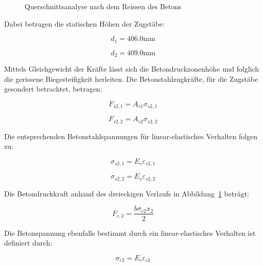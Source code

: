 \documentclass[
  12pt,
  letterpaper,
  egregdoesnotlikesansseriftitles]{scrreprt}
\begin{document}
\begin{figure}[H]


\caption{\label{fig-qs3_sv14}Querschnittsanalyse nach dem Reissen des
Betons}

\end{figure}%

Dabei betragen die statischen Höhen der Zugstäbe:

\begin{equation}d_{1} = 406.0 \text{mm}\end{equation}

\begin{equation}d_{2} = 409.0 \text{mm}\end{equation}

Mittels Gleichgewicht der Kräfte lässt sich die Betondruckzonenhöhe und
folglich die gerissene Biegesteifigkeit herleiten. Die
Betonstahlzugkräfte, für die Zugstäbe gesondert betrachtet, betragen:

\begin{equation}F_{s2,1} = A_{s 1} \sigma_{s 2,1}\end{equation}

\begin{equation}F_{s2,2} = A_{s 2} \sigma_{s 2,2}\end{equation}

Die entsprechenden Betonstahlspannungen für linear-elastisches Verhalten
folgen zu:

\begin{equation}\sigma_{s 2,1} = E_{s} \varepsilon_{s2,1}\end{equation}

\begin{equation}\sigma_{s 2,2} = E_{s} \varepsilon_{s2,2}\end{equation}

Die Betondruckkraft anhand des dreieckigen Verlaufs in
Abbildung~\ref{fig-qs3_sv14} beträgt:

\begin{equation}F_{c,2} = \frac{b \sigma_{c 2} x_{2}}{2}\end{equation}

Die Betonspannung ebenfalls bestimmt durch ein linear-elastisches
Verhalten ist definiert durch:

\begin{equation}\sigma_{c 2} = E_{c} \varepsilon_{c2}\end{equation}
\end{document}
